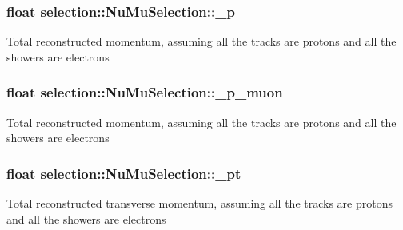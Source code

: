\subsubsection[{\texorpdfstring{\+\_\+p}{_p}}]{\setlength{\rightskip}{0pt plus 5cm}float selection\+::\+Nu\+Mu\+Selection\+::\+\_\+p\hspace{0.3cm}{\ttfamily [private]}}\hypertarget{classselection_1_1NuMuSelection_a821979901c138eca118246a1eeedcd80}{}\label{classselection_1_1NuMuSelection_a821979901c138eca118246a1eeedcd80}
Total reconstructed momentum, assuming all the tracks are protons and all the showers are electrons 
\subsubsection[{\texorpdfstring{\+\_\+p\+\_\+muon}{_p_muon}}]{\setlength{\rightskip}{0pt plus 5cm}float selection\+::\+Nu\+Mu\+Selection\+::\+\_\+p\+\_\+muon\hspace{0.3cm}{\ttfamily [private]}}\hypertarget{classselection_1_1NuMuSelection_a94f9c7445dc565e03c899633f031250d}{}\label{classselection_1_1NuMuSelection_a94f9c7445dc565e03c899633f031250d}
Total reconstructed momentum, assuming all the tracks are protons and all the showers are electrons 
\subsubsection[{\texorpdfstring{\+\_\+pt}{_pt}}]{\setlength{\rightskip}{0pt plus 5cm}float selection\+::\+Nu\+Mu\+Selection\+::\+\_\+pt\hspace{0.3cm}{\ttfamily [private]}}\hypertarget{classselection_1_1NuMuSelection_aab5bb47332ae2489a5ab96078397d075}{}\label{classselection_1_1NuMuSelection_aab5bb47332ae2489a5ab96078397d075}
Total reconstructed transverse momentum, assuming all the tracks are protons and all the showers are electrons 
